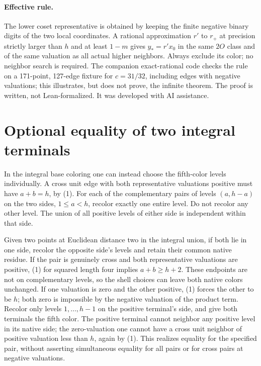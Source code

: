\documentclass[10pt,letterpaper]{article}
\begin{document}
\paragraph{Effective rule.}
The lower coset representative is obtained by keeping the
finite negative binary digits of the two local coordinates.
A rational approximation \(r'\) to \(r_+\) at precision strictly
larger than \(h\) and at least \(1-m\) gives \(y_*=r'x_0\)
in the same \(2O\) class and of the same valuation as all actual
higher neighbors. Always exclude its color; no neighbor search
is required. The companion exact-rational code checks the rule
on a 171-point, 127-edge fixture for \(c=31/32\), including
edges with negative valuations; this illustrates, but does not
prove, the infinite theorem. The proof is written, not
Lean-formalized. It was developed with AI assistance.

\section*{Optional equality of two integral terminals}
In the integral base coloring one can instead choose the fifth-color
levels individually. A cross unit edge with both representative
valuations positive must have \(a+b=h\), by (1).
For each of the complementary pairs of levels
\((a,h-a)\) on the two sides, \(1\le a<h\), recolor exactly one
entire level. Do not recolor any other level. The union of all
positive levels of either side is independent within that side.

Given two points at Euclidean distance two in the integral union,
if both lie in one side, recolor the opposite side's levels and
retain their common native residue. If the pair is genuinely cross
and both representative valuations are positive, (1) for squared
length four implies \(a+b\ge h+2\). These endpoints are not on
complementary levels, so the shell choices can leave both native
colors unchanged. If one valuation is zero and the other positive,
(1) forces the other to be \(h\); both zero is impossible by the
negative valuation of the product term. Recolor only levels
\(1,\ldots,h-1\) on the positive terminal's side, and give both
terminals the fifth color. The positive terminal cannot neighbor
any positive level in its native side; the zero-valuation one
cannot have a cross unit neighbor of positive valuation less than
\(h\), again by (1). This realizes equality for the specified pair,
without asserting simultaneous equality for all pairs or for cross
pairs at negative valuations.
\end{document}
